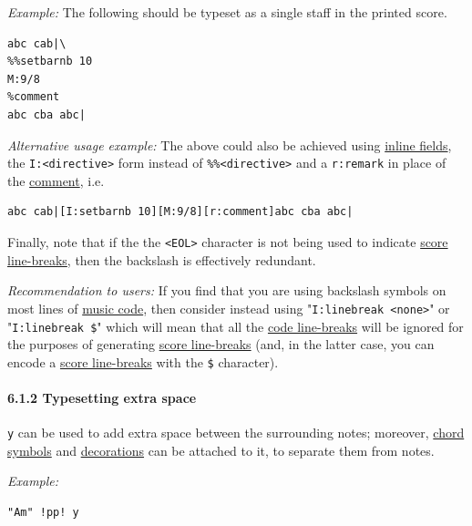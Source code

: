 \documentclass[oneside]{book}
\let\oldparagraph\paragraph
\renewcommand{\paragraph}[1]{\oldparagraph{#1}\mbox{}}
\begin{document}
\emph{Example:} The following should be typeset as a single staff in the
printed score.

\begin{verbatim}
abc cab|\
%%setbarnb 10
M:9/8
%comment
abc cba abc|
\end{verbatim}

\emph{Alternative usage example:} The above could also be achieved using
\protect\hyperlink{inline_field_definition}{inline fields}, the
\texttt{I:\textless{}directive\textgreater{}} form instead of
\texttt{\%\%\textless{}directive\textgreater{}} and a \texttt{r:remark}
in place of the \protect\hyperlink{comment_definition}{comment}, i.e.

\begin{verbatim}
abc cab|[I:setbarnb 10][M:9/8][r:comment]abc cba abc|
\end{verbatim}

Finally, note that if the the \texttt{\textless{}EOL\textgreater{}}
character is not being used to indicate
\protect\hyperlink{score_line-break_definition}{score line-breaks}, then
the backslash is effectively redundant.

\emph{Recommendation to users:} If you find that you are using backslash
symbols on most lines of \protect\hyperlink{music_code_definition}{music
code}, then consider instead using
"\texttt{I:linebreak\ \textless{}none\textgreater{}}" or
"\texttt{I:linebreak\ \$}" which will mean that all the
\protect\hyperlink{code_line-break_definition}{code line-breaks} will be
ignored for the purposes of generating
\protect\hyperlink{score_line-break_definition}{score line-breaks} (and,
in the latter case, you can encode a
\protect\hyperlink{score_line-break_definition}{score line-breaks} with
the \texttt{\$} character).

\hypertarget{typesetting_extra_space}{\paragraph{6.1.2 Typesetting extra
space}\label{typesetting_extra_space}}

\texttt{y} can be used to add extra space between the surrounding notes;
moreover, \protect\hyperlink{chord_symbols}{chord symbols} and
\protect\hyperlink{decorations}{decorations} can be attached to it, to
separate them from notes.

\emph{Example:}

\begin{verbatim}
"Am" !pp! y
\end{verbatim}
\end{document}

